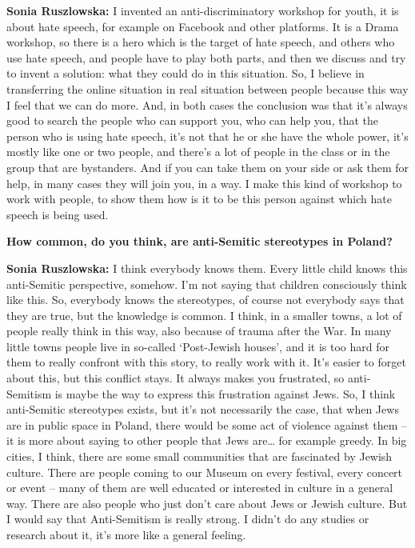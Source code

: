\textbf{Sonia Ruszlowska:} I invented an anti-discriminatory workshop for youth, it is about hate speech, for example on Facebook and other platforms. It is a Drama workshop, so there is a hero which is the target of hate speech, and others who use hate speech, and people have to play both parts, and then we discuss and try to invent a solution: what they could do in this situation. So, I believe in transferring the online situation in real situation between people because this way I feel that we can do more. And, in both cases the conclusion was that it’s always good to search the people who can support you, who can help you, that the person who is using hate speech, it’s not that he or she have the whole power, it’s mostly like one or two people, and there’s a lot of people in the class or in the group that are bystanders. And if you can take them on your side or ask them for help, in many cases they will join you, in a way. I make this kind of workshop to work with people, to show them how is it to be this person against which hate speech is being used. 

\textbf{How common, do you think, are anti-Semitic stereotypes in Poland?} 

\textbf{Sonia Ruszlowska:} I think everybody knows them. Every little child knows this anti-Semitic perspective, somehow. I’m not saying that children consciously think like this. So, everybody knows the stereotypes, of course not everybody says that they are true, but the knowledge is common. I think, in a smaller towns, a lot of people really think in this way, also because of trauma after the War. In many little towns people live in so-called ‘Post-Jewish houses’,  and it is too hard for them to really confront with this story, to really work with it. It’s easier to forget about this, but this conflict stays. It always makes you frustrated, so anti-Semitism is maybe the way to express this frustration against Jews. So, I think anti-Semitic stereotypes exists, but it’s not necessarily the case, that  when Jews are in public space in Poland, there would be some act of violence against them – it is more about saying to other people that Jews are… for example greedy. In big cities, I think, there are some small communities that are  fascinated by Jewish culture. There are people coming to our Museum on every festival, every concert or event – many of them are well educated or interested in culture in a general way. There are also people who just don’t care about Jews or Jewish culture. But I would say that Anti-Semitism is really strong. I didn’t do any studies or research about it, it’s more like a general feeling. 

